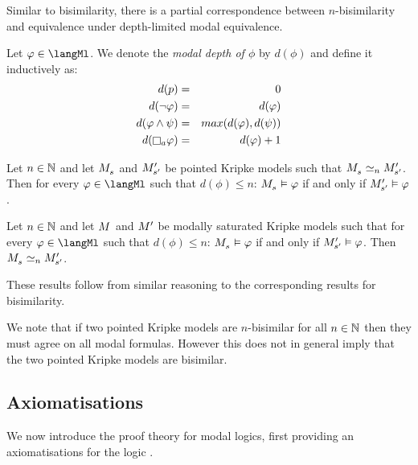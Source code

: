 \pagebreak

Similar to bisimilarity, there is a partial correspondence between $n$-bisimilarity and equivalence under depth-limited modal equivalence.

\begin{definition}
Let $\phi \in \langMl$.
We denote the {\em modal depth of $\phi$} by $d(\phi)$ and define it inductively as:
\begin{eqnarray*}
    d(\atomP) &=& 0\\
    d(\lnot \phi) &=& d(\phi)\\
    d(\phi \land \psi) &=& max(d(\phi), d(\psi))\\
    d(\necessaryA \phi) &=& d(\phi) + 1
\end{eqnarray*}
\end{definition}

\begin{proposition}
Let $n \in \mathbb{N}$ and let $\kPModel{\kStateS}$ and ${M^{\prime}_{{s}^{\prime}}}$ be pointed Kripke models such that $\kPModel{\kStateS} \bisimilar[n] \kPModelP{\kStateSP}$.
Then for every $\phi \in \langMl$ such that $d(\phi) \leq n$:
$\kPModel{\kStateS} \entails \phi$ if and only if ${M^{\prime}_{{s}^{\prime}}} \vDash \varphi$.
\end{proposition}

\begin{proposition}
Let $n \in \mathbb{N}$ and let $\kModel$ and ${M^{\prime}_{}}$ be modally saturated Kripke models such that for every $\phi \in \langMl$ such that $d(\phi) \leq n$: $\kPModel{\kStateS} \entails \phi$ if and only if ${M^{\prime}_{{s}^{\prime}}} \vDash \varphi$.
Then $\kPModel{\kStateS} \bisimilar[n] \kPModelP{\kStateSP}$.
\end{proposition}

These results follow from similar reasoning to the corresponding results for bisimilarity.

We note that if two pointed Kripke models are $n$-bisimilar for all $n \in \mathbb{N}$ then they must agree on all modal formulas.
However this does not in general imply that the two pointed Kripke models are bisimilar.

\pagebreak

\subsection{Axiomatisations}

We now introduce the proof theory for modal logics, first providing an axiomatisations for the logic \logicK{}.


